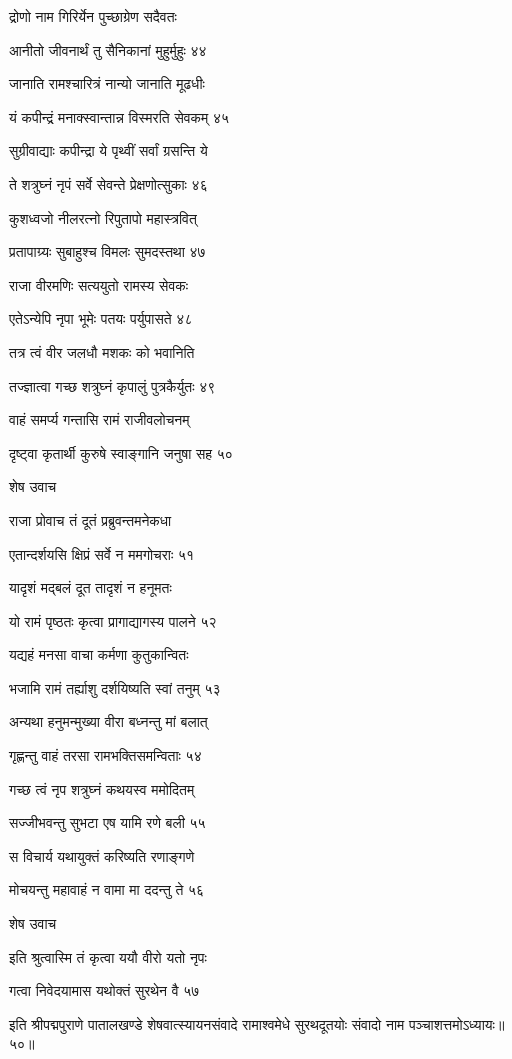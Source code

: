 द्रोणो नाम गिरिर्येन पुच्छाग्रेण सदैवतः

आनीतो जीवनार्थं तु सैनिकानां मुहुर्मुहुः ४४

जानाति रामश्चारित्रं नान्यो जानाति मूढधीः

यं कपीन्द्रं मनाक्स्वान्तान्न विस्मरति सेवकम् ४५

सुग्रीवाद्याः कपीन्द्रा ये पृथ्वीं सर्वां ग्रसन्ति ये

ते शत्रुघ्नं नृपं सर्वे सेवन्ते प्रेक्षणोत्सुकाः ४६

कुशध्वजो नीलरत्नो रिपुतापो महास्त्रवित्

प्रतापाग्र्यः सुबाहुश्च विमलः सुमदस्तथा ४७

राजा वीरमणिः सत्ययुतो रामस्य सेवकः

एतेऽन्येपि नृपा भूमेः पतयः पर्युपासते ४८

तत्र त्वं वीर जलधौ मशकः को भवानिति

तज्ज्ञात्वा गच्छ शत्रुघ्नं कृपालुं पुत्रकैर्युतः ४९

वाहं समर्प्य गन्तासि रामं राजीवलोचनम्

दृष्ट्वा कृतार्थी कुरुषे स्वाङ्गानि जनुषा सह ५०

शेष उवाच

राजा प्रोवाच तं दूतं प्रब्रुवन्तमनेकधा

एतान्दर्शयसि क्षिप्रं सर्वे न ममगोचराः ५१

यादृशं मद्बलं दूत तादृशं न हनूमतः

यो रामं पृष्ठतः कृत्वा प्रागाद्यागस्य पालने ५२

यद्यहं मनसा वाचा कर्मणा कुतुकान्वितः

भजामि रामं तर्ह्याशु दर्शयिष्यति स्वां तनुम् ५३

अन्यथा हनुमन्मुख्या वीरा बध्नन्तु मां बलात्

गृह्णन्तु वाहं तरसा रामभक्तिसमन्विताः ५४

गच्छ त्वं नृप शत्रुघ्नं कथयस्व ममोदितम्

सज्जीभवन्तु सुभटा एष यामि रणे बली ५५

स विचार्य यथायुक्तं करिष्यति रणाङ्गणे

मोचयन्तु महावाहं न वामा मा ददन्तु ते ५६

शेष उवाच

इति श्रुत्वास्मि तं कृत्वा ययौ वीरो यतो नृपः

गत्वा निवेदयामास यथोक्तं सुरथेन वै ५७

इति श्रीपद्मपुराणे पातालखण्डे शेषवात्स्यायनसंवादे रामाश्वमेधे सुरथदूतयोः संवादो नाम पञ्चाशत्तमोऽध्यायः॥५०॥



